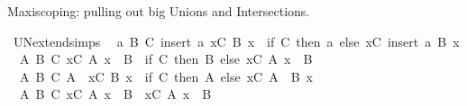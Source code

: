 \begin{isabellebody}
{\isafoldproof}%
%
\isadelimproof
%
\endisadelimproof
%
\begin{isamarkuptext}%
\medskip Maxiscoping: pulling out big Unions and Intersections.%
\end{isamarkuptext}\isamarkuptrue%
\isamarkupfalse%
\ UN{\isacharunderscore}{\kern0pt}extend{\isacharunderscore}{\kern0pt}simps{\isacharcolon}{\kern0pt}\isanewline
\ \ {\isachardoublequoteopen}{\isasymAnd}a\ B\ C{\isachardot}{\kern0pt}\ insert\ a\ {\isacharparenleft}{\kern0pt}{\isasymUnion}x{\isasymin}C{\isachardot}{\kern0pt}\ B\ x{\isacharparenright}{\kern0pt}\ {\isacharequal}{\kern0pt}\ {\isacharparenleft}{\kern0pt}if\ C{\isacharequal}{\kern0pt}{\isacharbraceleft}{\kern0pt}{\isacharbraceright}{\kern0pt}\ then\ {\isacharbraceleft}{\kern0pt}a{\isacharbraceright}{\kern0pt}\ else\ {\isacharparenleft}{\kern0pt}{\isasymUnion}x{\isasymin}C{\isachardot}{\kern0pt}\ insert\ a\ {\isacharparenleft}{\kern0pt}B\ x{\isacharparenright}{\kern0pt}{\isacharparenright}{\kern0pt}{\isacharparenright}{\kern0pt}{\isachardoublequoteclose}\isanewline
\ \ {\isachardoublequoteopen}{\isasymAnd}A\ B\ C{\isachardot}{\kern0pt}\ {\isacharparenleft}{\kern0pt}{\isasymUnion}x{\isasymin}C{\isachardot}{\kern0pt}\ A\ x{\isacharparenright}{\kern0pt}\ {\isasymunion}\ B\ {\isacharequal}{\kern0pt}\ {\isacharparenleft}{\kern0pt}if\ C{\isacharequal}{\kern0pt}{\isacharbraceleft}{\kern0pt}{\isacharbraceright}{\kern0pt}\ then\ B\ else\ {\isacharparenleft}{\kern0pt}{\isasymUnion}x{\isasymin}C{\isachardot}{\kern0pt}\ A\ x\ {\isasymunion}\ B{\isacharparenright}{\kern0pt}{\isacharparenright}{\kern0pt}{\isachardoublequoteclose}\isanewline
\ \ {\isachardoublequoteopen}{\isasymAnd}A\ B\ C{\isachardot}{\kern0pt}\ A\ {\isasymunion}\ {\isacharparenleft}{\kern0pt}{\isasymUnion}x{\isasymin}C{\isachardot}{\kern0pt}\ B\ x{\isacharparenright}{\kern0pt}\ {\isacharequal}{\kern0pt}\ {\isacharparenleft}{\kern0pt}if\ C{\isacharequal}{\kern0pt}{\isacharbraceleft}{\kern0pt}{\isacharbraceright}{\kern0pt}\ then\ A\ else\ {\isacharparenleft}{\kern0pt}{\isasymUnion}x{\isasymin}C{\isachardot}{\kern0pt}\ A\ {\isasymunion}\ B\ x{\isacharparenright}{\kern0pt}{\isacharparenright}{\kern0pt}{\isachardoublequoteclose}\isanewline
\ \ {\isachardoublequoteopen}{\isasymAnd}A\ B\ C{\isachardot}{\kern0pt}\ {\isacharparenleft}{\kern0pt}{\isacharparenleft}{\kern0pt}{\isasymUnion}x{\isasymin}C{\isachardot}{\kern0pt}\ A\ x{\isacharparenright}{\kern0pt}\ {\isasyminter}\ B{\isacharparenright}{\kern0pt}\ {\isacharequal}{\kern0pt}\ {\isacharparenleft}{\kern0pt}{\isasymUnion}x{\isasymin}C{\isachardot}{\kern0pt}\ A\ x\ {\isasyminter}\ B{\isacharparenright}{\kern0pt}{\isachardoublequoteclose}\isanewline

\end{isabellebody}
